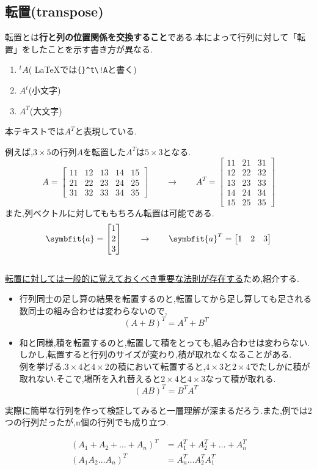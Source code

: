 \subsection{転置(transpose)}\label{subsec:transpose}
転置とは\textbf{行と列の位置関係を交換すること}である.本によって行列に対して「転置」をしたことを示す書き方が異なる.
\begin{enumerate}
    \item ${}^t\!A$\;( \LaTeX では\verb|{}^t\!A|と書く)
    \item $A^t$(小文字)
    \item $A^T$(大文字)
\end{enumerate}
本テキストでは$A^T$と表現している.

例えば,$3\times5$の行列$A$を転置した$A^T$は$5\times3$となる.
\[
A=\begin{bmatrix}
    11 & 12 & 13 & 14 & 15 \\
    21 & 22 & 23 & 24 & 25 \\ 
    31 & 32 & 33 & 34 & 35 
\end{bmatrix}\qquad\to\qquad
A^T=
\begin{bmatrix}
    11 & 21 & 31 \\
    12 & 22 & 32 \\
    13 & 23 & 33 \\
    14 & 24 & 34 \\
    15 & 25 & 35 
\end{bmatrix}
\]
また,列ベクトルに対してももちろん転置は可能である.
\[
    \symbfit{a}=\begin{bmatrix}
        1 \\ 2 \\ 3
    \end{bmatrix}\qquad\to\qquad
    \symbfit{a}^T=\begin{bmatrix}
        1 & 2 & 3
    \end{bmatrix}
\]
\bigskip\\

\underline{転置に対しては一般的に覚えておくべき重要な法則が存在する}ため,紹介する.
\begin{itemize}
    \item 行列同士の足し算の結果を転置するのと,転置してから足し算しても足される数同士の組み合わせは変わらないので,
\[
    (A+B)^T=A^T+B^T
\]
\item 和と同様,積を転置するのと,転置して積をとっても,組み合わせは変わらない.しかし,転置すると行列のサイズが変わり,積が取れなくなることがある.\\
例を挙げる.$3\times4$と$4\times2$の積において転置すると,$4\times3$と$2\times4$でたしかに積が取れない.そこで,場所を入れ替えると$2\times4$と$4\times3$なって積が取れる.
\[
    (AB)^T = B^TA^T
\]
\end{itemize}
実際に簡単な行列を作って検証してみると一層理解が深まるだろう.また,例では2つの行列だったが,n個の行列でも成り立つ.
\begin{tcolorbox}[colframe=black!80,colback=white,title=転置の性質]
\begin{align*}
    (A_1+A_2+\dots+A_n)^T&=A_1^T+A_2^T+\dots+A_n^T\\
        (A_1A_2\dots A_n)^T&=A_n^T\dots A_2^TA_1^T
\end{align*}
\end{tcolorbox}
